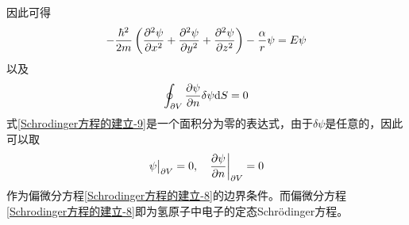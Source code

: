 因此可得
\begin{equation}
	-\frac{\hbar^2}{2m}\left(\frac{\partial^2 \psi}{\partial x^2} + \frac{\partial^2 \psi}{\partial y^2} + \frac{\partial^2 \psi}{\partial z^2}\right) - \frac{\alpha}{r}\psi = E\psi
	\label{Schrodinger方程的建立-8}
\end{equation}
以及
\begin{equation}
	\oint_{\partial V} \frac{\partial \psi}{\partial n} \delta \psi \mathrm{d}S = 0
	\label{Schrodinger方程的建立-9}
\end{equation}
式\eqref{Schrodinger方程的建立-9}是一个面积分为零的表达式，由于$\delta \psi$是任意的，因此可以取
\begin{equation}
	\psi\big|_{\partial V} = 0,\quad \dfrac{\partial \psi}{\partial n}\bigg|_{\partial V} = 0
\end{equation}
作为偏微分方程\eqref{Schrodinger方程的建立-8}的边界条件。而偏微分方程\eqref{Schrodinger方程的建立-8}即为氢原子中电子的定态Schr\"{o}dinger方程。